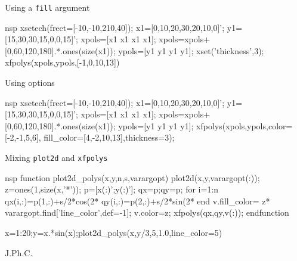 \begin{examples}

\noindent Using a \verb!fill! argument
\begin{mintednsp}{nsp}
  xsetech(frect=[-10,-10,210,40]);
  x1=[0,10,20,30,20,10,0]';
  y1=[15,30,30,15,0,0,15]';
  xpols=[x1 x1 x1 x1]; xpols=xpols+[0,60,120,180].*.ones(size(x1));
  ypols=[y1 y1 y1 y1];
  xset('thickness',3);
  xfpolys(xpols,ypols,[-1,0,10,13])
\end{mintednsp}

\noindent Using options

\begin{mintednsp}{nsp}
  xsetech(frect=[-10,-10,210,40]);
  x1=[0,10,20,30,20,10,0]';
  y1=[15,30,30,15,0,0,15]';
  xpols=[x1 x1 x1 x1]; xpols=xpols+[0,60,120,180].*.ones(size(x1));
  ypols=[y1 y1 y1 y1];
  xfpolys(xpols,ypols,color=[-2,-1,5,6], fill_color=[4,-2,10,13],thickness=3);
\end{mintednsp}

\noindent Mixing \verb!plot2d! and \verb!xfpolys!

\begin{mintednsp}{nsp}
function plot2d_polys(x,y,n,s,varargopt)
  plot2d(x,y,varargopt(:));
  z=ones(1,size(x,'*'));
  p=[x(:)';y(:)'];
  qx=p;qy=p;
  for i=1:n
    qx(i,:)=p(1,:)+s/2*cos(2*%
    qy(i,:)=p(2,:)+s/2*sin(2*%
  end
  v.fill_color= z* varargopt.find['line_color',def=-1];
  v.color=z;
  xfpolys(qx,qy,v(:));
endfunction

x=1:20;y=x.*sin(x);plot2d_polys(x,y/3,5,1.0,line_color=5)
\end{mintednsp}

\end{examples}

\begin{manseealso}
    
\end{manseealso}


\begin{authors}
  J.Ph.C.

\end{authors}
